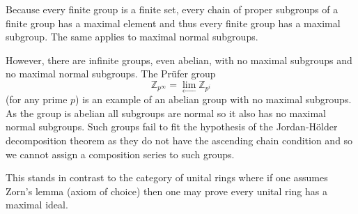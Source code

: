 \documentclass[12pt]{article}
\begin{document}
Because every finite group is a finite set, every chain of proper subgroups
of a finite group has a maximal element and thus every finite group has
a maximal subgroup.  The same applies to maximal normal subgroups.

However, there are infinite groups, even abelian, with no maximal subgroups and
no maximal normal subgroups.  The Pr\"ufer group 
  \[\mathbb{Z}_{p^\infty}=\lim_{\longleftarrow}\mathbb{Z}_{p^i}\]
(for any prime $p$) is an example of an abelian group with no maximal subgroups.
As the group is abelian all subgroups are normal so it also has no maximal
normal subgroups.  Such groups fail to fit the hypothesis of the Jordan-H\"older decomposition theorem as they do not have the ascending chain condition and so we cannot assign a composition series to such groups.

This stands in contrast to the category of unital rings where if one assumes Zorn's lemma (axiom of choice) then one may prove every unital ring
has a maximal ideal. 
\end{document}
